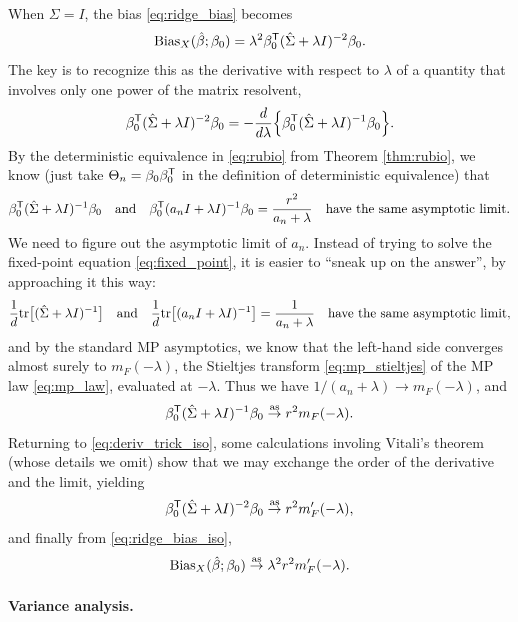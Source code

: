 \documentclass{article}
\begin{document}
When $\Sigma = I$, the bias \eqref{eq:ridge_bias} becomes 
\begin{equation}
\label{eq:ridge_bias_iso}
\mathrm{Bias}_X(\hat{\beta}; \beta_0) = \lambda^2 \beta_0^{\mathsf{T}} (\hat\Sigma + \lambda I)^{-2}
\beta_0.  
\end{equation}
The key is to recognize this as the derivative with respect to $\lambda$ of
a quantity that involves only one power of the matrix resolvent,
\begin{equation}
\label{eq:deriv_trick_iso}
\beta_0^{\mathsf{T}} (\hat\Sigma + \lambda I)^{-2} \beta_0 = - \frac{d}{d\lambda} \Big \{
\beta_0^{\mathsf{T}} (\hat\Sigma + \lambda I)^{-1} \beta_0 \Big\}.  
\end{equation}
By the deterministic equivalence in \eqref{eq:rubio} from Theorem
\ref{thm:rubio}, we know (just take $\Theta_n = \beta_0\beta_0^{\mathsf{T}}$ in the
definition of deterministic equivalence) that  
\[
\beta_0^{\mathsf{T}} (\hat\Sigma + \lambda I)^{-1} \beta_0 \quad \text{and} \quad 
\beta_0^{\mathsf{T}} (a_n I + \lambda I)^{-1} \beta_0 = \frac{r^2}{a_n + \lambda} \quad
\text{have the same asymptotic limit}. 
\]
We need to figure out the asymptotic limit of $a_n$. Instead of trying to
solve the fixed-point equation \eqref{eq:fixed_point}, it is easier to ``sneak
up on the answer'', by approaching it this way:
\[
\frac{1}{d} \mathrm{tr} \big[ (\hat\Sigma + \lambda I)^{-1} \big] \quad \text{and} \quad 
\frac{1}{d} \mathrm{tr} \big[ (a_n I + \lambda I)^{-1} \big] = \frac{1}{a_n + \lambda}
\quad \text{have the same asymptotic limit},  
\]
and by the standard MP asymptotics, we know that the left-hand side converges
almost surely to $m_F(-\lambda)$, the Stieltjes transform
\eqref{eq:mp_stieltjes} of the MP law \eqref{eq:mp_law}, evaluated at
$-\lambda$. Thus we have $1/(a_n + \lambda) \to m_F(-\lambda)$, and 
\[
\beta_0^{\mathsf{T}} (\hat\Sigma + \lambda I)^{-1} \beta_0 \overset{\mathrm{as}}{\to} r^2 m_F(-\lambda).
\]
Returning to \eqref{eq:deriv_trick_iso}, some calculations involing Vitali's
theorem (whose details we omit) show that we may exchange the order of the 
derivative and the limit, yielding 
\[
\beta_0^{\mathsf{T}} (\hat\Sigma + \lambda I)^{-2} \beta_0 \overset{\mathrm{as}}{\to} r^2 m'_F(-\lambda), 
\]
and finally from \eqref{eq:ridge_bias_iso}, 
\begin{equation}
\label{eq:ridge_bias_iso_limit}
\mathrm{Bias}_X(\hat{\beta}; \beta_0) \overset{\mathrm{as}}{\to} \lambda^2 r^2 m'_F(-\lambda).
\end{equation}

\paragraph{Variance analysis.}
\end{document}
